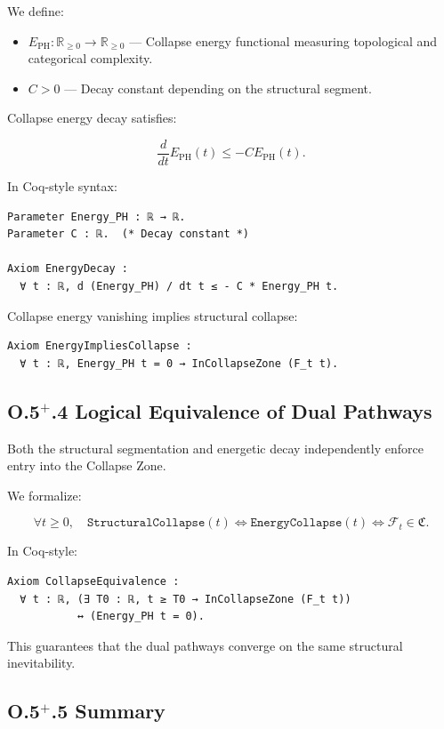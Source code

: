 \documentclass[11pt]{article}
\begin{document}
We define:

\begin{itemize}
  \item \( E_{\mathrm{PH}} : \mathbb{R}_{\geq 0} \to \mathbb{R}_{\geq 0} \) — Collapse energy functional measuring topological and categorical complexity.
  \item \( C > 0 \) — Decay constant depending on the structural segment.
\end{itemize}

Collapse energy decay satisfies:

\[
\frac{d}{dt} E_{\mathrm{PH}}(t) \leq -C E_{\mathrm{PH}}(t).
\]

In Coq-style syntax:

\begin{lstlisting}[language=Coq]
Parameter Energy_PH : ℝ → ℝ.
Parameter C : ℝ.  (* Decay constant *)

Axiom EnergyDecay :
  ∀ t : ℝ, d (Energy_PH) / dt t ≤ - C * Energy_PH t.
\end{lstlisting}

Collapse energy vanishing implies structural collapse:

\begin{lstlisting}[language=Coq]
Axiom EnergyImpliesCollapse :
  ∀ t : ℝ, Energy_PH t = 0 → InCollapseZone (F_t t).
\end{lstlisting}

\subsection*{O.5$^+$.4 Logical Equivalence of Dual Pathways}

Both the structural segmentation and energetic decay independently enforce entry into the Collapse Zone.

We formalize:

\[
\forall t \geq 0,\quad \texttt{StructuralCollapse}(t) \iff \texttt{EnergyCollapse}(t) \iff \mathcal{F}_t \in \mathfrak{C}.
\]

In Coq-style:

\begin{lstlisting}[language=Coq]
Axiom CollapseEquivalence :
  ∀ t : ℝ, (∃ T0 : ℝ, t ≥ T0 → InCollapseZone (F_t t))
           ↔ (Energy_PH t = 0).
\end{lstlisting}

This guarantees that the dual pathways converge on the same structural inevitability.

\subsection*{O.5$^+$.5 Summary}
\end{document}
